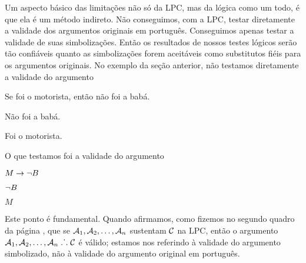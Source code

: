 Um aspecto básico das limitações não só da LPC, mas da lógica como um todo, é que ela é um método indireto.
Não conseguimos, com a LPC, testar diretamente a validade dos argumentos originais em português.
Conseguimos apenas testar a validade de suas simbolizações.
Então os resultados de nossos testes lógicos serão tão confiáveis quanto as simbolizações forem aceitáveis como substitutos fiéis para os argumentos originais.
No exemplo da seção anterior, não testamos diretamente a validade do argumento
	\begin{earg}
		\item[] Se foi o motorista, então não foi a babá.
		\item[] Não foi a babá.
		\item[\therefore] Foi o motorista.
	\end{earg}
O que testamos foi a validade do argumento
	\begin{earg}
		\item[] $M \rightarrow \neg B$
		\item[] $\neg B$
		\item[\therefore] $M$
	\end{earg}

Este ponto é fundamental.
Quando afirmamos, como fizemos no segundo quadro da página \pageref{SusVal}, que se $\mathcal{A}_1, \mathcal{A}_2, \ldots, \mathcal{A}_n$ sustentam $\mathcal{C}$ na LPC, então o argumento  $\mathcal{A}_1, \mathcal{A}_2, \ldots, \mathcal{A}_n \mathrel{\ldotp\dot{}\,\ldotp} \mathcal{C}$ é  válido; estamos nos referindo à validade do argumento simbolizado, não à validade do argumento original em português.

